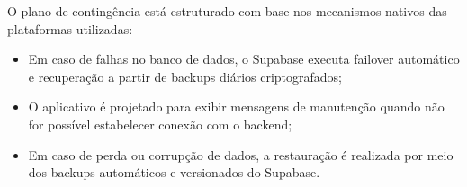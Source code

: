 O plano de contingência está estruturado com base nos mecanismos nativos das
plataformas utilizadas:

\begin{itemize}
  \item Em caso de falhas no banco de dados, o Supabase executa failover
        automático e recuperação a partir de backups diários criptografados;
  \item O aplicativo é projetado para exibir mensagens de manutenção quando
        não for possível estabelecer conexão com o backend;
  \item Em caso de perda ou corrupção de dados, a restauração é realizada por
        meio dos backups automáticos e versionados do Supabase.
\end{itemize}
